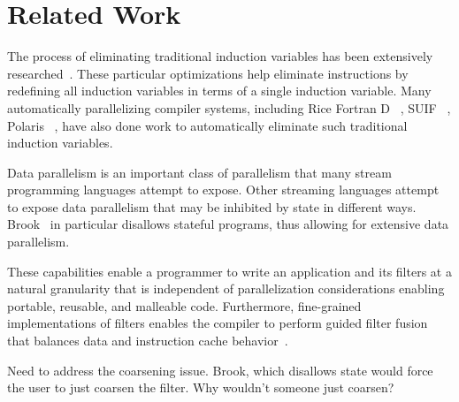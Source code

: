 \section{Related Work}
\label{sec:related}


The process of eliminating traditional induction variables has been
extensively researched~\cite{Bacon:1994,RM99:RRV}.  These particular
optimizations help eliminate instructions by redefining all induction
variables in terms of a single induction variable.  Many automatically
parallelizing compiler systems, including Rice Fortran D
~\cite{Hiranandani:1992}, SUIF ~\cite{Wilson:1994}, Polaris
~\cite{Blume:1996}, have also done work to automatically eliminate
such traditional induction variables.

Data parallelism is an important class of parallelism that many stream
programming languages attempt to expose.  Other streaming languages
attempt to expose data parallelism that may be inhibited by state in
different ways.  Brook~\cite{brook04} in particular disallows stateful
programs, thus allowing for extensive data parallelism.



These capabilities enable a programmer to write an application and its
filters at a natural granularity that is independent of
parallelization considerations enabling portable, reusable, and
malleable code.  Furthermore, fine-grained implementations of filters
enables the compiler to perform guided filter fusion that balances
data and instruction cache behavior~\cite{sermulins-lctes05}.


Need to address the coarsening issue.  Brook, which disallows state
would force the user to just coarsen the filter.  Why wouldn't someone
just coarsen?  

